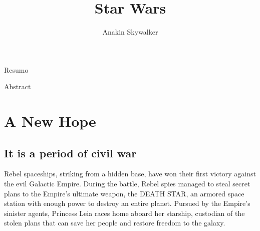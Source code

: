 \documentclass[oneside]{ifgw}
\title{Star Wars}
\author{Anakin Skywalker}
\institute{Instituto de Física ``Gleb Wataghin''}
\begin{document}

\maketitle
\facepage


\abstractname{Resumo}
\begin{abstract}
\lipsum[1-2]
\end{abstract}

\abstractname{Abstract}
\begin{abstract}
\lipsum[1-2]
\end{abstract}

\tableofcontents


\chapter{A New Hope}

\section{It is a period of civil war}

Rebel spaceships, striking from a hidden base, have won their first victory against the evil Galactic Empire.  During the battle, Rebel spies managed to steal secret plans to the Empire's ultimate weapon, the DEATH STAR, an armored space station with enough power to destroy an entire planet. Pursued by the Empire's sinister agents, Princess Leia races home aboard her starship, custodian of the stolen plans that can save her people and restore freedom to the galaxy.


\lipsum[1-4]
\end{document}

